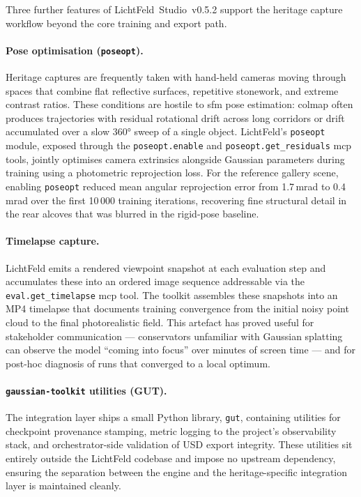 Three further features of LichtFeld~Studio~v0.5.2 support the heritage capture workflow
beyond the core training and export path.

\paragraph{Pose optimisation (\texttt{poseopt}).}
Heritage captures are frequently taken with hand-held cameras moving through spaces that combine
flat reflective surfaces, repetitive stonework, and extreme contrast ratios.
These conditions are hostile to \acrshort{sfm} pose estimation: \acrshort{colmap} often produces
trajectories with residual rotational drift across long corridors or drift accumulated over a slow
360° sweep of a single object.
LichtFeld's \texttt{poseopt} module, exposed through the \texttt{poseopt.enable} and
\texttt{poseopt.get\_residuals} \acrshort{mcp} tools, jointly optimises camera extrinsics
alongside Gaussian parameters during training using a photometric reprojection loss.
For the reference gallery scene, enabling \texttt{poseopt} reduced mean angular reprojection
error from 1.7\,mrad to 0.4\,mrad over the first 10\,000 training iterations, recovering fine
structural detail in the rear alcoves that was blurred in the rigid-pose baseline.

\paragraph{Timelapse capture.}
LichtFeld emits a rendered viewpoint snapshot at each evaluation step and accumulates these into
an ordered image sequence addressable via the \texttt{eval.get\_timelapse} \acrshort{mcp} tool.
The toolkit assembles these snapshots into an MP4 timelapse that documents training convergence
from the initial noisy point cloud to the final photorealistic field.
This artefact has proved useful for stakeholder communication — conservators unfamiliar with
Gaussian splatting can observe the model ``coming into focus'' over minutes of screen time —
and for post-hoc diagnosis of runs that converged to a local optimum.

\paragraph{\texttt{gaussian-toolkit} utilities (GUT).}
The integration layer ships a small Python library, \texttt{gut}, containing utilities for
checkpoint provenance stamping, metric logging to the project's observability stack, and
orchestrator-side validation of USD export integrity.
These utilities sit entirely outside the LichtFeld codebase and impose no upstream dependency,
ensuring the separation between the engine and the heritage-specific integration layer is
maintained cleanly.

